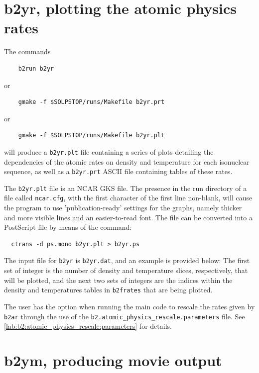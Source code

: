 \documentclass[a4paper,10pt]{report}
\begin{document}
\newpage
\section{b2yr, plotting the atomic physics rates}
\label{sec:b2yr}

The commands
\begin{verbatim}
    b2run b2yr
\end{verbatim}
or
\begin{verbatim}
    gmake -f $SOLPSTOP/runs/Makefile b2yr.prt
\end{verbatim}
or
\begin{verbatim}
    gmake -f $SOLPSTOP/runs/Makefile b2yr.plt
\end{verbatim}
will produce a {\tt b2yr.plt} file containing a series of
plots detailing the dependencies of the atomic rates on density and temperature for
each isonuclear sequence, as well as a {\tt b2yr.prt} ASCII file containing
tables of these rates.

The {\tt b2yr.plt} file is an NCAR GKS file. The presence in the run directory of a file called {\tt ncar.cfg}, with the
first character of the first line non-blank, will cause the program to use
'publication-ready' settings for the graphs, namely thicker and more visible lines
and an easier-to-read font. The file can be converted into a PostScript file by means of the command:
\begin{verbatim}
  ctrans -d ps.mono b2yr.plt > b2yr.ps
\end{verbatim}

The input file for {\tt b2yr} is {\tt b2yr.dat}, and an example is provided below:
The first set of integer is the number of density and temperature slices, respectively, that will be plotted, and the next two sets of integers are the indices within the density and temperatures tables in {\tt b2frates} that are being plotted.
 
The user has the option when running the main code to rescale the rates given by {\tt b2ar}
through the use of the {\tt b2.atomic\_physics\_rescale.parameters} file. See
\ref{lab:b2:atomic_physics_rescale:parameters} for details.

\newpage
\section{b2ym, producing movie output}
\label{sec:b2ym}
\end{document}
